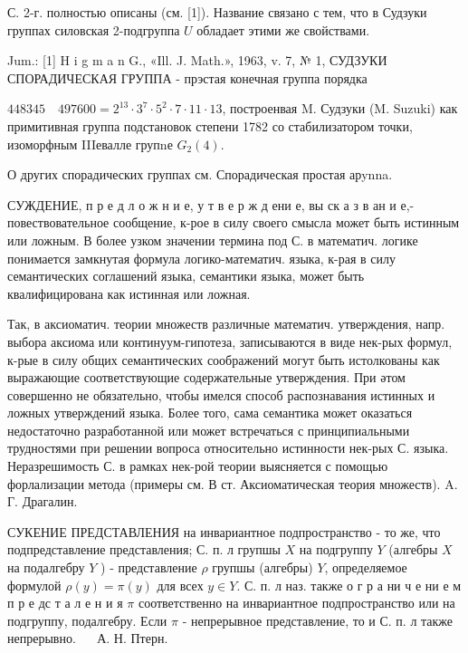 \documentclass[10pt]{article}
\begin{document}
С. 2-г. полностью описаны (см. [1]). Название связано с тем, что в Судзуки группах силовская 2-подгруппа $U$ обладает этими же свойствами.



Jum.: [1] H i g m a n G., «Ill. J. Math.», 1963, v. 7, № 1, СУДЗУКИ СПОРАДИЧЕСКАЯ ГРУППА - прэстая конечная группа порядка



$448345 \quad 497600=2^{13} \cdot 3^{7} \cdot 5^{2} \cdot 7 \cdot 11 \cdot 13$, построенвая M. Судзуки (M. Suzuki) как примитивная группа подстановок степени 1782 со стабилизатором точки, изоморфным IIIевалле групnе $G_{2}(4)$.



О других спорадических группах см. Спорадическая простая арynna.



СУЖДЕНИЕ, п р е д л о ж н и е, у т в е р ж д ени е, вы ск а з в ан и е,- повествовательное сообщение, к-рое в силу своего смысла может быть истинным или ложным. В более узком значении термина под С. в математич. логике понимается замкнутая формула логико-математич. языка, к-рая в силу семантических соглашений языка, семантики языка, может быть квалифицирована как истинная или ложная.



Так, в аксиоматич. теории множеств различные математич. утверждения, напр. выбора аксиома или континуум-гипотеза, записываются в виде нек-рых формул, к-рые в силу общих семантических соображений могут быть истолкованы как выражающие соответствующие содержательные утверждения. При әтом совершенно не обязательно, чтобы имелся способ распознавания истинных и ложных утверждений языка. Более того, сама семантика может оказаться недостаточно разработанной или может встречаться с принципиальными трудностями при решении вопроса относительно истинности нек-рых С. языка. Неразрешимость С. в рамках нек-рой теории выясняется с помощью форлализации метода (примеры см. В ст. Аксиоматическая теория множеств). A. Г. Драгалин.



СУКЕНИЕ ПРЕДСТАВЛЕНИЯ на инвариантное подпространство - то же, что подпредставление представления; С. п. л групшы $X$ на подгруппу $Y$ (алгебры $X$ на подалгебру $Y$ ) - представление $\rho$ групшы (алгебры) $Y$, определяемое формулой $\rho(y)=\pi(y)$ для всех $y \in Y$. С. п. л наз. также о г р а ни ч е ни е м п р е дс т а л е н и я $\pi$ соответственно на инвариантное подпространство или на подгруппу, подалгебру. Если $\pi$ - непрерывное представление, то и С. п. л также непрерывно. $\quad$ А. Н. Птерн.
\end{document}
